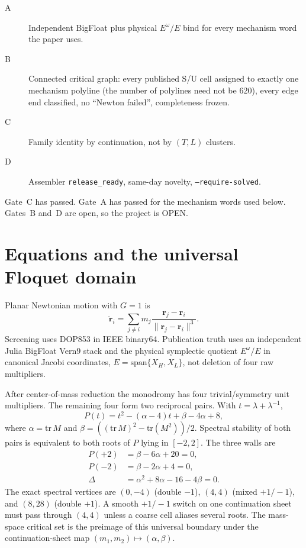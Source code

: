 \documentclass[11pt]{article}
\begin{document}
\begin{description}
\item[A] Independent BigFloat plus physical $E^\omega/E$ bind for every
mechanism word the paper uses.
\item[B] Connected critical graph: every published S/U cell assigned to exactly
one mechanism polyline (the number of polylines need not be $620$), every edge
end classified, no ``Newton failed'', completeness frozen.
\item[C] Family identity by continuation, not by $(T,L)$ clusters.
\item[D] Assembler \texttt{release\_ready}, same-day novelty,
\texttt{--require-solved}.
\end{description}
Gate~C has passed.
Gate~A has passed for the mechanism words used below.
Gates~B and~D are open, so the project is OPEN.

\section{Equations and the universal Floquet domain}

Planar Newtonian motion with $G=1$ is
\begin{equation}
\ddot{\mathbf r}_i=\sum_{j\ne i}m_j\frac{\mathbf r_j-\mathbf r_i}{\lVert\mathbf r_j-\mathbf r_i\rVert^3}.
\end{equation}
Screening uses DOP853 in IEEE binary64.
Publication truth uses an independent Julia BigFloat Vern9 stack and the
physical symplectic quotient $E^\omega/E$ in canonical Jacobi coordinates,
$E=\mathrm{span}\{X_H,X_L\}$, not deletion of four raw multipliers.

After center-of-mass reduction the monodromy has four trivial/symmetry unit
multipliers.
The remaining four form two reciprocal pairs.
With $t=\lambda+\lambda^{-1}$,
\[
P(t)=t^2-(\alpha-4)t+\beta-4\alpha+8,
\]
where $\alpha=\mathrm{tr}\,M$ and
$\beta=((\mathrm{tr}\,M)^2-\mathrm{tr}(M^2))/2$.
Spectral stability of both pairs is equivalent to both roots of $P$ lying in
$[-2,2]$.
The three walls are
\begin{align}
P(+2)&=\beta-6\alpha+20=0,\\
P(-2)&=\beta-2\alpha+4=0,\\
\Delta&=\alpha^2+8\alpha-16-4\beta=0.
\end{align}
The exact spectral vertices are
$(0,-4)$ (double $-1$), $(4,4)$ (mixed $+1/-1$), and $(8,28)$ (double $+1$).
A smooth $+1/-1$ switch on one continuation sheet must pass through $(4,4)$
unless a coarse cell aliases several roots.
The mass-space critical set is the preimage of this universal boundary under
the continuation-sheet map $(m_1,m_2)\mapsto(\alpha,\beta)$.
\end{document}
